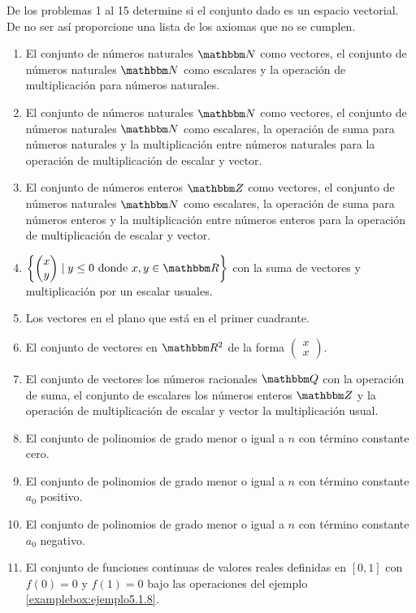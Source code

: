 \noindent
De los problemas 1 al 15 determine si el conjunto dado es un espacio vectorial. De no ser así proporcione una lista de los axiomas que no se cumplen.
\begin{enumerate}
    \item El conjunto de números naturales $\NN$ como vectores, el conjunto de números naturales $\NN$ como escalares y la operación de multiplicación para números naturales.
    \item El conjunto de números naturales $\NN$ como vectores, el conjunto de números naturales $\NN$ como escalares, la operación de suma para números naturales y la multiplicación entre números naturales para la operación de multiplicación de escalar y vector.
    \item El conjunto de números enteros $\ZZ$ como vectores, el conjunto de números naturales $\NN$ como escalares, la operación de suma para números enteros y la multiplicación entre números enteros para la operación de multiplicación de escalar y vector.
    \item $\left\{ \begin{pmatrix} x \\ y \end{pmatrix} \mid y \leq 0 \text{ donde } x, y \in \RR \right\}$ con la suma de vectores y multiplicación por un escalar usuales.
    \item Los vectores en el plano que está en el primer cuadrante.
    \item El conjunto de vectores en $\RR[2]$ de la forma $\begin{pmatrix} x \\ x \end{pmatrix}$.
    \item El conjunto de vectores los números racionales $\QQ$ con la operación de suma, el conjunto de escalares los números enteros $\ZZ$ y la operación de multiplicación de escalar y vector la multiplicación usual.
    \item El conjunto de polinomios de grado menor o igual a $n$ con término constante cero.
    \item El conjunto de polinomios de grado menor o igual a $n$ con término constante $a_{0}$ positivo.
    \item El conjunto de polinomios de grado menor o igual a $n$ con término constante $a_{0}$ negativo.
    \item El conjunto de funciones continuas de valores reales definidas en $[0, 1]$ con $f(0) = 0$ y $f(1) = 0$ bajo las operaciones del ejemplo \ref{examplebox:ejemplo5.1.8}.

\end{enumerate}
